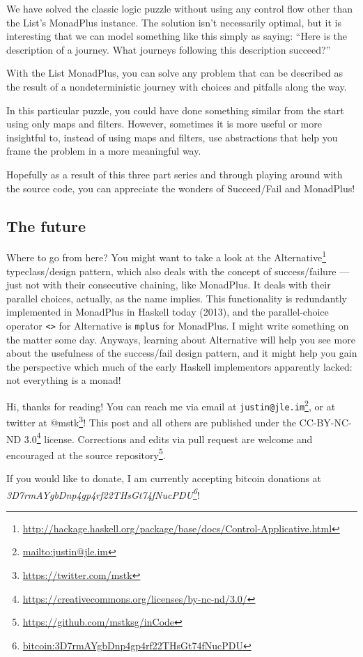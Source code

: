 \documentclass[]{article}
\renewcommand{\href}[2]{#2\footnote{\url{#1}}}
\begin{document}
We have solved the classic logic puzzle without using any control flow other
than the List's MonadPlus instance. The solution isn't necessarily optimal, but
it is interesting that we can model something like this simply as saying: ``Here
is the description of a journey. What journeys following this description
succeed?''

With the List MonadPlus, you can solve any problem that can be described as the
result of a nondeterministic journey with choices and pitfalls along the way.

In this particular puzzle, you could have done something similar from the start
using only maps and filters. However, sometimes it is more useful or more
insightful to, instead of using maps and filters, use abstractions that help you
frame the problem in a more meaningful way.

Hopefully as a result of this three part series and through playing around with
the source code, you can appreciate the wonders of Succeed/Fail and MonadPlus!

\hypertarget{the-future}{%
\subsection{The future}\label{the-future}}

Where to go from here? You might want to take a look at the
\href{http://hackage.haskell.org/package/base/docs/Control-Applicative.html}{Alternative}
typeclass/design pattern, which also deals with the concept of success/failure
--- just not with their consecutive chaining, like MonadPlus. It deals with
their parallel choices, actually, as the name implies. This functionality is
redundantly implemented in MonadPlus in Haskell today (2013), and the
parallel-choice operator \texttt{\textless{}\textbar{}\textgreater{}} for
Alternative is \texttt{mplus} for MonadPlus. I might write something on the
matter some day. Anyways, learning about Alternative will help you see more
about the usefulness of the success/fail design pattern, and it might help you
gain the perspective which much of the early Haskell implementors apparently
lacked: not everything is a monad!

Hi, thanks for reading! You can reach me via email at
\href{mailto:justin@jle.im}{\nolinkurl{justin@jle.im}}, or at twitter at
\href{https://twitter.com/mstk}{@mstk}! This post and all others are published
under the \href{https://creativecommons.org/licenses/by-nc-nd/3.0/}{CC-BY-NC-ND
3.0} license. Corrections and edits via pull request are welcome and encouraged
at \href{https://github.com/mstksg/inCode}{the source repository}.

If you would like to donate, I am currently accepting bitcoin donations at
\emph{\href{bitcoin:3D7rmAYgbDnp4gp4rf22THsGt74fNucPDU}{3D7rmAYgbDnp4gp4rf22THsGt74fNucPDU}}!
\end{document}
